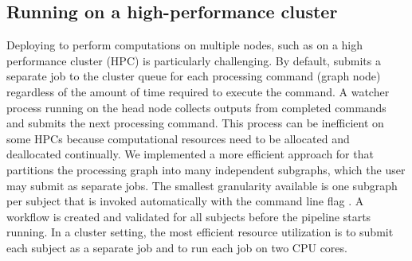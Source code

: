 \subsection{Running on a high-performance cluster}

Deploying  to perform computations on multiple nodes, such as on a high performance cluster (HPC) is particularly challenging. By default,  submits a separate job to the cluster queue for each processing command (graph node) regardless of the amount of time required to execute the command. A watcher process running on the head node collects outputs from completed commands and submits the next processing command. This process can be inefficient on some HPCs because computational resources need to be allocated and deallocated continually. We implemented a more efficient approach for  that partitions the processing graph into many independent subgraphs, which the user may submit as separate jobs. The smallest granularity available is one subgraph per subject that is invoked automatically with the command line flag . A  workflow is created and validated for all subjects before the pipeline starts running. In a cluster setting, the most efficient resource utilization is to submit each subject as a separate job and to run each job on two CPU cores.

